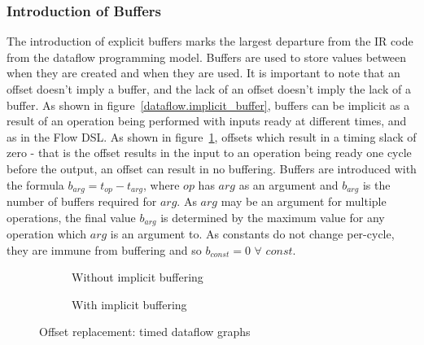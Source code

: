 \subsubsection*{Introduction of Buffers}
The introduction of explicit buffers marks the largest departure from the IR code from the dataflow programming model. Buffers are used to store values between when they are created and when they are used. It is important to note that an offset doesn't imply a buffer, and the lack of an offset doesn't imply the lack of a buffer. As shown in figure \ref{dataflow.implicit_buffer}, buffers can be implicit as a result of an operation being performed with inputs ready at different times, and as in the Flow DSL. As shown in figure \ref{dataflow.no_buffer}, offsets which result in a timing slack of zero \hyphen{} that is the offset results in the input to an operation being ready one cycle before the output, an offset can result in no buffering. Buffers are introduced with the formula $b_{arg} = t_{op} - t_{arg}$, where $op$ has $arg$ as an argument and $b_{arg}$ is the number of buffers required for $arg$. As $arg$ may be an argument for multiple operations, the final value $b_{arg}$ is determined by the maximum value for any operation which $arg$ is an argument to. As constants do not change per-cycle, they are immune from buffering and so $b_{const} = 0$ $\forall$ $const$.

\begin{figure}[h]
  \centering
  \begin{subfigure}[t]{0.5\textwidth}\centering
    \caption{Without implicit buffering}
  \end{subfigure}%
  \begin{subfigure}[t]{0.5\textwidth}\centering
    \caption{With implicit buffering}
  \end{subfigure}
  \caption{Offset replacement: timed dataflow graphs}\label{dataflow.no_buffer}
\end{figure}

